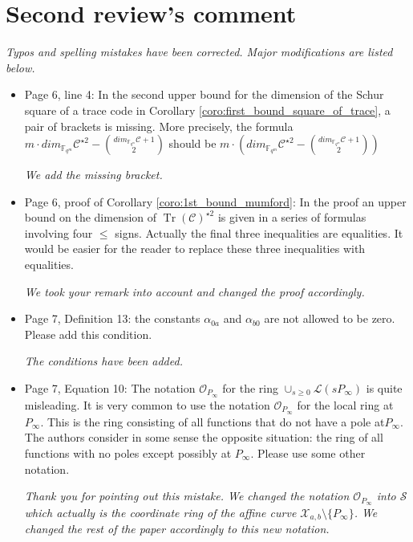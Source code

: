 \documentclass[12pt,a4paper]{amsart}
\DeclareMathOperator{\trace}{Tr}
\newcommand{\fqm}{\mathbb{F}_{q^m}}
\newcommand{\calC}{\mathcal{C}}
\newcommand{\calX}{\mathcal{X}}
\newcommand{\Tr}[1]{\trace\!\left(#1\right)}
\begin{document}
\section*{Second review's comment}

\textit{Typos and spelling mistakes have been corrected. Major modifications are listed below.} \\

\begin{itemize}

\item Page 6, line 4: In the second upper bound for the dimension of the Schur square of a trace code in Corollary \ref{coro:first_bound_square_of_trace}, a pair of brackets is missing. More precisely, the formula $m \cdot dim_{\fqm} \calC^{\star 2}-\binom{dim_{\fqm}\calC+1}{2}$ should be $m \cdot \left( dim_{\fqm} \calC^{\star 2} -\binom{dim_{\fqm} \calC+1}{2}\right)$

\textit{We add the missing bracket.}

\item Page 6, proof of Corollary \ref{coro:1st_bound_mumford}: In the proof an upper bound on the dimension of $\Tr{\calC}^{\star 2}$ is given in a series of formulas involving four $\le$ signs. Actually the final three inequalities are equalities. It would be easier for the reader to replace these three inequalities with equalities.

\textit{We took your remark into account and changed the proof accordingly.}


\item Page 7, Definition 13: the constants $\alpha_{0a}$ and $\alpha_{b0}$ are not allowed to be zero. Please add this condition.

\textit{The conditions have been added.} 

\item Page 7, Equation 10: The notation $\mathcal{O}_{P_\infty}$ for the ring $\cup_{s \ge 0} \mathcal{L}(sP_\infty)$ is quite misleading. It is very common to use the notation $\mathcal{O}_{P_\infty}$ for the local ring at $P_\infty$. This is the ring consisting of all functions that do not have a pole at$ P_\infty$. The authors consider in some sense the opposite situation: the ring of all functions with no poles except possibly at $P_\infty$. Please use some other notation.

\textit{Thank you for pointing out this mistake. We changed the notation $\mathcal{O}_{P_\infty}$ into $\mathcal{S}$ which actually is the coordinate ring of the affine curve $\calX_{a,b} \setminus \{P_\infty\}$. We changed the rest of the paper accordingly to this new notation.}


\end{itemize}
\end{document}
